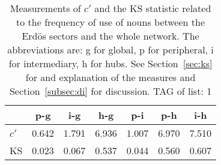 \begin{table}[h!]
\begin{center}
\caption{Measurements of $c'$ and the KS statistic related to the frequency of use of nouns between the Erd\"os sectors and the whole network. The abbreviations are: g for global, p for peripheral, i for intermediary, h for hubs. See Section~\ref{sec:ks} for and explanation of the measures and Section~\ref{subsec:di} for discussion. TAG of list: 1}\label{tab:kolSub}
\begin{tabular}{l | c c c c c c}
{\bf } & {\bf p-g} & {\bf i-g} & {\bf h-g} & {\bf p-i} & {\bf p-h} & {\bf i-h} \\\hline
$c'$ & 0.642  & 1.791  & 6.936  & 1.007  & 6.970  & 7.510 \\
KS & 0.023  & 0.067  & 0.537  & 0.044  & 0.560  & 0.607 \\
\end{tabular}
\end{center}
\end{table}
